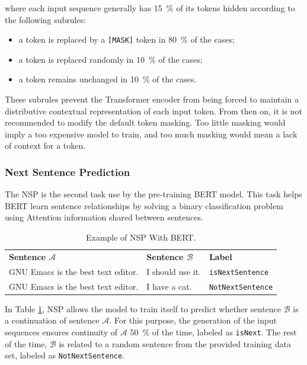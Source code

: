 where each input sequence generally has \SI{15}{\percent} of its tokens hidden
according to the following subrules:
\begin{itemize}
\item a token is replaced by a \texttt{[MASK]} token in \SI{80}{\percent} of the
  cases;
\item a token is replaced randomly in \SI{10}{\percent} of the cases;
\item a token remains unchanged in \SI{10}{\percent} of the cases.
\end{itemize}

These subrules prevent the Transformer encoder from being forced to maintain a
distributive contextual representation of each input token. From then on, it is
not recommended to modify the default token masking. Too little masking would
imply a too expensive model to train, and too much masking would mean a lack of
context for a token.

\subsubsection{Next Sentence Prediction}
\label{subsubsec:bert:nsp}

The NSP is the second task use by the pre-training BERT model. This task helps
BERT learn sentence relationships by solving a binary classification problem
using Attention information shared between sentences.
\begin{table}[!ht]
  \centering
  \caption{Example of NSP With BERT.}
  \label{tab:bert:nsp}
  \begin{tabular}{lll}
    \textbf{Sentence $\mathcal{A}$} & \textbf{Sentence $\mathcal{B}$} & \textbf{Label} \\
    GNU Emacs is the best text editor. & I should use it. & \texttt{isNextSentence} \\
    GNU Emacs is the best text editor. & I have a cat. & \texttt{NotNextSentence} \\
  \end{tabular}
\end{table}

In Table \ref{tab:bert:nsp}, NSP allows the model to train itself to predict
whether sentence $\mathcal{B}$ is a continuation of sentence $\mathcal{A}$. For
this purpose, the generation of the input sequences ensures continuity of
$\mathcal{A}$ \SI{50}{\percent} of the time, labeled as \texttt{isNext}. The
rest of the time, $\mathcal{B}$ is related to a random sentence from the
provided training data set, labeled as \texttt{NotNextSentence}.

